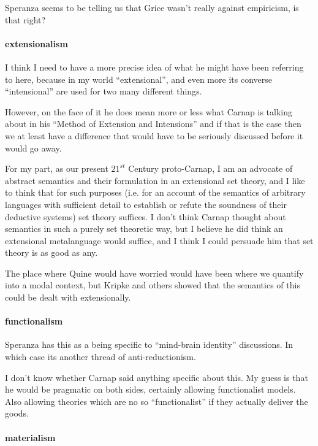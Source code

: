 \documentclass[10pt,titlepage]{book}
\begin{document}
Speranza seems to be telling us that Grice wasn't really against empiricism, is that right?
 
\paragraph{extensionalism}

I think I need to have a more precise idea of what he might have been referring to here, because in my world ``extensional'', and even more its converse ``intensional'' are used for two many different things.

However, on the face of it he does mean more or less what Carnap is talking about in his ``Method of Extension and Intensions'' and if that is the case then we at least have a difference that would have to be seriously discussed before it would go away.

For my part, as our present $21^{st}$ Century proto-Carnap, I am an advocate of abstract semantics and their formulation in an extensional set theory, and I like to think that for such purposes (i.e. for an account of the semantics of arbitrary languages with sufficient detail to establish or refute the soundness of their deductive systems) set theory suffices.
I don't think Carnap thought about semantics in such a purely set theoretic way, but I believe he did think an extensional metalanguage would suffice, and I think I could persuade him that set theory is as good as any.

The place where Quine would have worried would have been where we quantify into a modal context, but Kripke and others showed that the semantics of this could be dealt with extensionally.

\paragraph{functionalism}

Speranza has this as a being specific to ``mind-brain identity'' discussions.
In which case its another thread of anti-reductionism.

I don't know whether Carnap said anything specific about this.
My guess is that he would be pragmatic on both sides, certainly allowing functionalist models.
Also allowing theories which are no so ``functionalist'' if they actually deliver the goods.

\paragraph{materialism}
\end{document}
